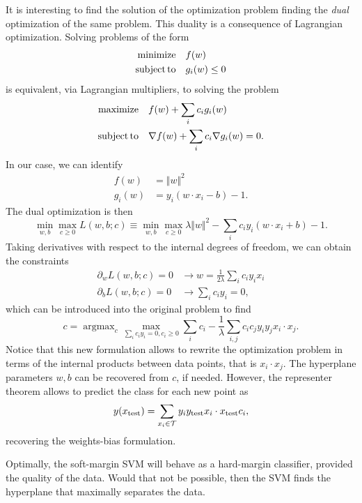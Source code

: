 \documentclass[]{report}
\begin{document}
It is interesting to find the solution of the optimization problem finding the \textit{dual} optimization of the same problem. This duality is a consequence of Lagrangian optimization. Solving problems of the form
\begin{align}
{\rm minimize} & \quad f(w) \\
{\rm subject\, to} & \quad g_i(w) \leq 0 
\end{align}
is equivalent, via Lagrangian multipliers, to solving the problem
\begin{align}
{\rm maximize} & \quad f(w) + \sum_i c_i g_i(w) \\
{\rm subject\, to} & \quad \nabla f(w) + \sum_i c_i \nabla g_i(w) = 0.
\end{align}
In our case, we can identify
\begin{align}
f(w) & = \Vert w \Vert^2 \\ 
g_i(w) & = y_i(w \cdot x_i - b) - 1.
\end{align}
The dual optimization is then 
\begin{equation}
\min_{w, b} \max_{c \geq 0} L(w, b; c) \equiv \min_{w, b} \max_{c \geq 0} \lambda \Vert w \Vert^2 - \sum_i c_i y_i (w \cdot x_i + b) - 1.
\end{equation}
Taking derivatives with respect to the internal degrees of freedom, we can obtain the constraints
\begin{align}
\partial_w L(w, b; c) = 0 & \rightarrow w = \frac{1}{2\lambda} \sum_i c_i y_i x_i \\
\partial_b L(w, b; c) = 0 & \rightarrow \sum_i c_i y_i = 0, 
\end{align}
which can be introduced into the original problem to find
\begin{equation}
c = \operatorname{argmax}_c\max_{\sum_i c_i y_i = 0, c_i \geq 0} \sum_{i} c_i - \frac{1}{\lambda} \sum_{i, j} c_i c_j y_i y_j x_i \cdot x_j.
\end{equation}
Notice that this new formulation allows to rewrite the optimization problem in terms of the internal products between data points, that is $x_i \cdot x_j$. The hyperplane parameters $w, b$ can be recovered from $c$, if needed. However, the representer theorem allows to predict the class for each new point as
\begin{equation}
y(x_{\rm test}) = \sum_{x_i \in \mathcal T} y_i y_{\rm test} x_i \cdot x_{\rm test} c_i, 
\end{equation}
recovering the weights-bias formulation.

Optimally, the soft-margin SVM will behave as a hard-margin classifier, provided the quality of the data. Would that not be possible, then the SVM finds the hyperplane that maximally separates the data. 
\end{document}
